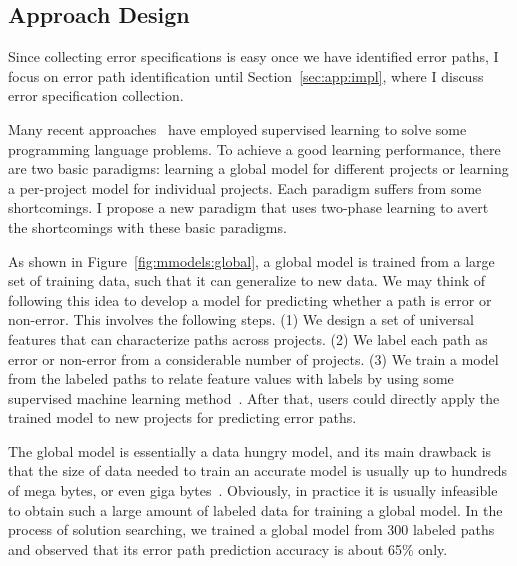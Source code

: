 \documentclass[12pt]{report}	%
\begin{document}
\subsection{Approach Design}
\label{sec:app:overview:design}

Since collecting error specifications is easy once we have identified
error paths, I focus on error path identification 
until Section~\ref{sec:app:impl}, where I discuss error specification collection.

Many recent approaches~\cite{wu2017learning,Eric2017learning,balog2016deepcoder,pradel2018deepbugs}
have employed supervised learning to solve some programming language problems. 
%
To achieve a good learning performance, there are two basic paradigms:
learning a global model for different projects or learning a 
per-project model for individual projects. Each paradigm suffers
from some shortcomings. I propose a new paradigm that uses 
two-phase learning to avert the shortcomings with these basic
paradigms. 

%
As shown in Figure~\ref{fig:mmodels:global},
a global model is trained from a large set of training data,
such that it can generalize to new data.
%
We may think of following this idea to develop a model for predicting whether 
a path is error or non-error. This involves the following steps. 
(1) We design a set of universal features that can characterize paths across projects. 
(2) We label each path as error or non-error from a considerable number of projects. 
(3) We train a model from the labeled paths to relate
feature values with labels by using some supervised machine learning method~\cite{hastie2009overview}.
After that, users could directly apply the trained model to new projects for predicting error paths.

The global model is essentially a data hungry model,
and its main drawback is that the size of data needed to train an accurate model is usually up to hundreds of mega bytes,
or even giga bytes~\cite{russakovsky2015imagenet}.
Obviously, in practice it is usually infeasible to obtain such a large amount of labeled data for training a global model. 
%
In the process of solution searching,
we trained a global model from 300 labeled paths 
and observed that its error path prediction accuracy is about 65\% only.
\end{document}
